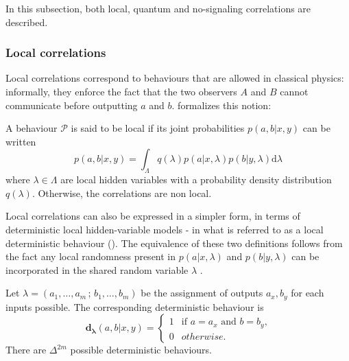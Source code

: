 In this subsection, both local, quantum and no-signaling correlations are described.



\subsubsection{Local correlations}

Local correlations correspond to behaviours that are allowed in classical physics: informally, they enforce the fact that the two observers $A$ and $B$ cannot communicate before outputting $a$ and $b$.  formalizes this notion:

\begin{definition}
\label{def:local-corr}
A behaviour $\mathcal{P}$ is said to be
local if its joint probabilities $p(a,b|x,y)$ can be written \begin{equation}
    p(a,b|x,y) = \int_\Lambda q(\lambda) p(a|x,\lambda)p(b|y,\lambda)
    \mathrm{d}\lambda
\end{equation} where $\lambda \in \Lambda$ are local hidden variables with a
probability density distribution $q(\lambda)$. Otherwise, the correlations are
non local. \\ \end{definition}

Local correlations can also be expressed in a simpler form, in terms of deterministic local hidden-variable models - in what is referred to as a local deterministic behaviour (). The equivalence of these two definitions follows from the fact any local randomness present in $p(a | x, \lambda)$ and $p(b | y, \lambda)$ can be incorporated in the shared random variable $\lambda$ \cite{brunner}.

\begin{definition}\label{def:local-det-beh} Let
$\lambda=(a_1,\ldots,a_m\,;\,b_1,\ldots,b_m)$ be the assignment of outputs
$a_x,b_y$ for each inputs possible. The corresponding deterministic behaviour is
\begin{equation}
    \mathbf{d_\lambda}(a,b|x,y) = \begin{cases} 1 & \text{if } a=a_x \text{ and
    } b=b_y \text{,}\\ 0 & otherwise \text{.} \end{cases}
\end{equation} There are $\Delta^{2m}$ possible deterministic behaviours.
\end{definition}

